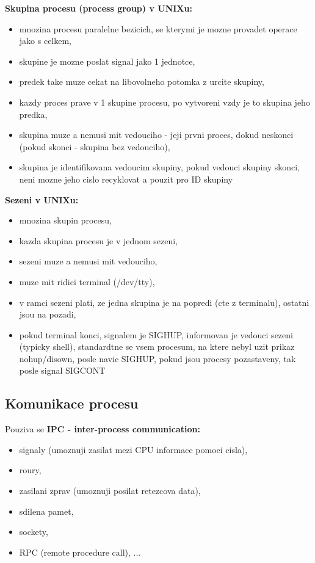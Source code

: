 \documentclass[a4paper, 11pt]{article}
\begin{document}
\textbf{Skupina procesu (process group) v UNIXu:}
\begin{itemize}
    \item mnozina procesu paralelne bezicich, se kterymi je mozne provadet operace jako s celkem,
    \item skupine je mozne poslat signal jako 1 jednotce,
    \item predek take muze cekat na libovolneho potomka z urcite skupiny,
    \item kazdy proces prave v 1 skupine procesu, po vytvoreni vzdy je to skupina jeho predka,
    \item skupina muze a nemusi mit vedouciho - jeji prvni proces, dokud neskonci (pokud skonci - skupina bez vedouciho),
    \item skupina je identifikovana vedoucim skupiny, pokud vedouci skupiny skonci, neni mozne jeho cislo recyklovat a pouzit pro ID skupiny \\
\end{itemize}

\textbf{Sezeni v UNIXu:}
\begin{itemize}
    \item mnozina skupin procesu,
    \item kazda skupina procesu je v jednom sezeni,
    \item sezeni muze a nemusi mit vedouciho,
    \item muze mit ridici terminal (/dev/tty),
    \item v ramci sezeni plati, ze jedna skupina je na popredi (cte z terminalu), ostatni jsou na pozadi,
    \item pokud terminal konci, signalem je SIGHUP, informovan je vedouci sezeni (typicky shell), standardtne se vsem procesum, na ktere nebyl uzit prikaz nohup/disown, posle navic SIGHUP, pokud jsou procesy pozastaveny, tak posle signal SIGCONT \\
\end{itemize}

\newpage

\subsection{Komunikace procesu}
Pouziva se \textbf{IPC - inter-process communication:}
\begin{itemize}
    \item signaly (umoznuji zasilat mezi CPU informace pomoci cisla),
    \item roury,
    \item zasilani zprav (umoznuji posilat retezcova data),
    \item sdilena pamet,
    \item sockety,
    \item RPC (remote procedure call), ... \\
\end{itemize}
\end{document}
